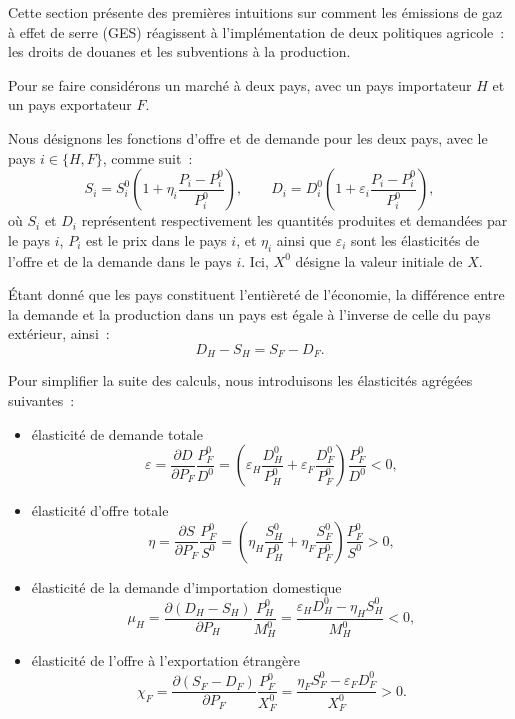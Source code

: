 Cette section présente des premières intuitions sur comment les émissions de gaz à effet de serre (GES) réagissent à l'implémentation de deux politiques agricole~: les droits de douanes et les subventions à la production.

Pour se faire considérons un marché à deux pays, avec un pays importateur $H$ et un pays exportateur $F$.

Nous désignons les fonctions d'offre et de demande pour les deux pays, avec le pays $i \in \{H, F\}$, comme suit~:
\begin{equation}
    S_i = S_i^0\left(1 + \eta_i\frac{P_i - P_i^0}{P_i^0}\right), \qquad
    D_i = D_i^0\left(1 + \varepsilon_i\frac{P_i - P_i^0}{P_i^0}\right),
\end{equation}
où $S_i$ et $D_i$ représentent respectivement les quantités produites et demandées par le pays $i$, $P_i$ est le prix dans le pays $i$, et $\eta_i$ ainsi que $\varepsilon_i$ sont les élasticités de l'offre et de la demande dans le pays $i$. Ici, $X^0$ désigne la valeur initiale de $X$.

Étant donné que les pays constituent l'entièreté de l'économie, la différence entre la demande et la production dans un pays est égale à l'inverse de celle du pays extérieur, ainsi~:
\begin{equation}
    D_H - S_H = S_F - D_F.
\end{equation}

Pour simplifier la suite des calculs, nous introduisons les élasticités agrégées suivantes~:
\begin{itemize}
    \item élasticité de demande totale
          \begin{equation}
              \varepsilon = \frac{\partial D}{\partial P_F} \frac{P_F^0}{D^0} = \left( \varepsilon_H \frac{D_H^0}{P_H^0} + \varepsilon_F \frac{D_F^0}{P_F^0} \right)\frac{P_F^0}{D^0} < 0,
          \end{equation}
    \item élasticité d'offre totale
          \begin{equation}
              \eta = \frac{\partial S}{\partial P_F} \frac{P_F^0}{S^0} = \left( \eta_H \frac{S_H^0}{P_H^0} + \eta_F \frac{S_F^0}{P_F^0} \right)\frac{P_F^0}{S^0} > 0,
          \end{equation}
    \item élasticité de la demande d'importation domestique
          \begin{equation}
              \mu_H = \frac{\partial (D_H - S_H)}{\partial P_H} \frac{P_H^0}{M_H^0} = \frac{\varepsilon_H D_H^0 - \eta_H S_H^0}{M_H^0} < 0,
          \end{equation}
    \item élasticité de l'offre à l'exportation étrangère
          \begin{equation}
              \chi_F = \frac{\partial (S_F - D_F)}{\partial P_F} \frac{P_F^0}{X_F^0} = \frac{\eta_F S_F^0 - \varepsilon_F D_F^0}{X_F^0} > 0.
          \end{equation}
\end{itemize}

